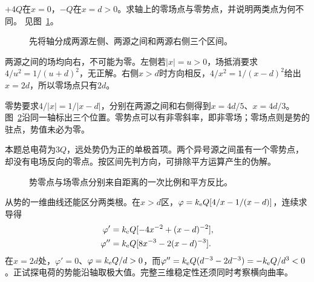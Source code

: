 \begin{exercise}[不等量异号点电荷]\label{ex:es1-h4}
$+4Q$在$x=0$，$-Q$在$x=d>0$。求轴上的零场点与零势点，并说明两类点为何不同。 见图~\ref{fig:es1-h4-q}。
\end{exercise}

\begin{figure}[H]\centering
{}
\caption{先将轴分成两源左侧、两源之间和两源右侧三个区间。}\label{fig:es1-h4-q}
\end{figure}
\begin{solution}
两源之间的场均向右，不可能为零。左侧若$|x|=u>0$，场抵消要求$4/u^2=1/(u+d)^2$，无正解。右侧$x>d$时方向相反，$4/x^2=1/(x-d)^2$给出$x=2d$，所以零场点只有$2d$。

零势要求$4/|x|=1/|x-d|$，分别在两源之间和右侧得到$x=4d/5$、$x=4d/3$。图~\ref{fig:es1-h4-s}沿同一轴标出三个位置。零势点可以有非零斜率，即非零场；零场点则是势的驻点，势值未必为零。

本题总电荷为$3Q$，远处势仍为正的单极首项。两个异号源之间虽有一个零势点，却没有电场反向的零点。按区间先判方向，可排除平方运算产生的伪解。
\begin{figure}[H]\centering
{}
\caption{势零点与场零点分别来自距离的一次比例和平方反比。}\label{fig:es1-h4-s}
\end{figure}


从势的一维曲线还能区分两类根。在$x>d$区，$\varphi=k_{\rm e} Q[4/x-1/(x-d)]$，连续求导得
\[\begin{aligned}
\varphi'&=k_{\rm e} Q[-4x^{-2}+(x-d)^{-2}],\\
\varphi''&=k_{\rm e} Q[8x^{-3}-2(x-d)^{-3}].
\end{aligned}\]
在$x=2d$处，$\varphi'=0$、$\varphi=k_{\rm e} Q/d>0$，而$\varphi''=k_{\rm e} Q(d^{-3}-2d^{-3})=-k_{\rm e} Q/d^3<0$。正试探电荷的势能沿轴取极大值。完整三维稳定性还须同时考察横向曲率。
\end{solution}

